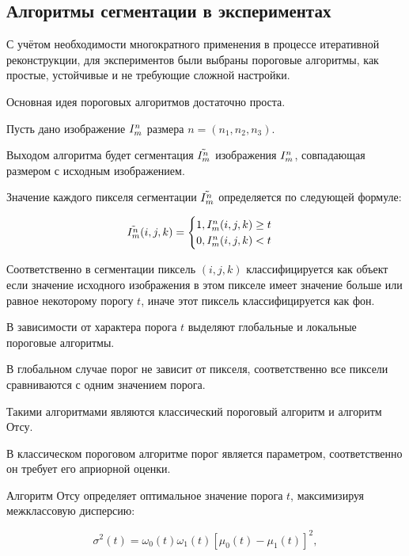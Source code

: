 
\subsection{Алгоритмы сегментации в экспериментах}

С учётом необходимости многократного применения в процессе итеративной реконструкции, для экспериментов были выбраны пороговые алгоритмы, как простые, устойчивые и не требующие сложной настройки.

Основная идея пороговых алгоритмов достаточно проста. 

Пусть дано изображение \(I^n_m\) размера \(n = (n_1, n_2, n_3)\).

Выходом алгоритма будет сегментация \(\tilde{I^n_m}\) изображения \(I^n_m\), совпадающая размером с исходным изображением.

Значение каждого пикселя сегментации \(\tilde{I^n_m}\) определяется по следующей формуле:

\begin{equation}
    \tilde{I^n_m} (i, j, k) = 
    \begin{cases}
        1, I^n_m(i, j, k) \geq t\\
        0, I^n_m(i, j, k) < t
    \end{cases}
\end{equation}

Соответственно в сегментации пиксель \((i, j, k)\) классифицируется как объект если значение исходного изображения в этом пикселе имеет значение больше или равное некоторому порогу \(t\), иначе этот пиксель классифицируется как фон.

В зависимости от характера порога \(t\) выделяют глобальные и локальные пороговые алгоритмы.

В глобальном случае порог не зависит от пикселя, соответственно все пиксели сравниваются с одним значением порога.

Такими алгоритмами являются классический пороговый алгоритм и алгоритм Отсу.

В классическом пороговом алгоритме порог является параметром, соответственно он требует его априорной оценки.

Алгоритм Отсу \cite{otsu1975threshold} определяет оптимальное значение порога \(t\), максимизируя межклассовую дисперсию:

\begin{equation}
    \sigma^2(t) = \omega_0(t) \omega_1(t) \left[ \mu_0(t) - \mu_1(t) \right]^2,
\end{equation}

